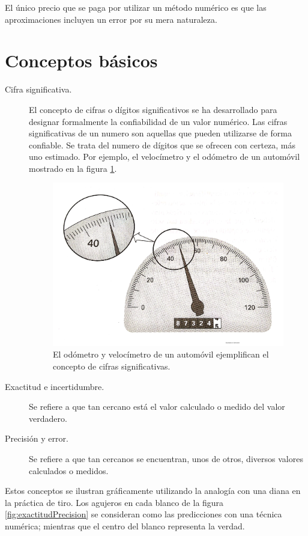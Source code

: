El único precio que se paga por utilizar un método numérico es que las aproximaciones incluyen un error por su mera naturaleza.


\section{Conceptos básicos}

\begin{description}
	\item[Cifra significativa. ] El concepto de cifras o dígitos significativos se ha desarrollado para designar formalmente la confiabilidad de 
		un valor numérico. Las cifras significativas de un numero son aquellas que pueden utilizarse de forma confiable. Se trata del numero de dígitos 
		que se ofrecen con certeza, más uno estimado. Por ejemplo, el velocímetro y el odómetro de un automóvil mostrado en la figura \ref{fig:odometro}.
		\begin{figure}[H]
			\centering
			\includegraphics[scale=0.25]{img/odometro.pdf}
			\caption{El odómetro y velocímetro de un automóvil ejemplifican el concepto de cifras significativas.}
			\label{fig:odometro}
		\end{figure}
	\item[Exactitud e incertidumbre. ] Se refiere a que tan cercano está el valor calculado o medido del valor verdadero.
	\item[Precisión y error. ] Se refiere a que tan cercanos se encuentran, unos de otros, diversos valores calculados o medidos.
\end{description}

Estos conceptos se ilustran gráficamente utilizando la analogía con una diana en la práctica de tiro. Los agujeros en cada blanco de la figura 
\ref{fig:exactitudPrecision} se consideran como las predicciones con una técnica numérica; mientras que el centro del blanco representa la verdad. 

